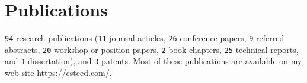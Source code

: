\documentclass[11pt, letterpaper]{article}
\begin{document}
\section*{Publications}
\texttt{94} research publications
(\texttt{11} journal articles,
\texttt{26} conference papers, \texttt{9} referred abstracts,
\texttt{20} workshop or position papers, \texttt{2} book
chapters, \texttt{25} technical reports, and \texttt{1} dissertation),
and \texttt{3} patents.
Most of these publications are available on my web site \href{https://csteed.com/}{https://csteed.com/}.
\end{document}
